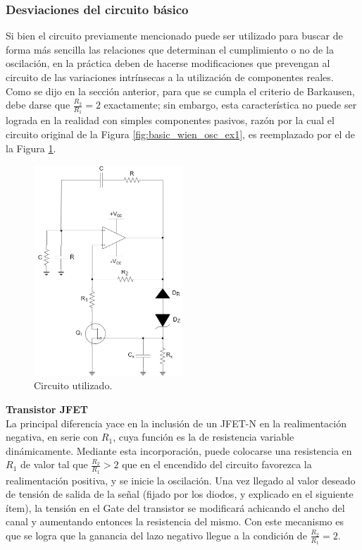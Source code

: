 \subsubsection{Desviaciones del circuito básico}
Si bien el circuito previamente mencionado puede ser utilizado para buscar de forma más sencilla las relaciones que determinan el cumplimiento o no de la oscilación, en 
la práctica deben de hacerse modificaciones que prevengan al circuito de las variaciones intrínsecas a la utilización de componentes reales.
Como se dijo en la sección anterior, para que se cumpla el criterio de Barkausen, debe darse que $\frac{R_2}{R_1} = 2$ exactamente; sin embargo, esta característica no 
puede ser lograda en la realidad con simples componentes pasivos, razón por la cual el circuito original de la Figura \ref{fig:basic_wien_osc_ex1}, es reemplazado por el 
de la Figura \ref{fig:wein_osc_circuit_ex1}.
\begin{figure}[H]
    \centering
    \includegraphics[width=0.5\textwidth]{../EJ1/Recursos/wein_osc_circuit.jpg}
    \caption{Circuito utilizado.}
    \label{fig:wein_osc_circuit_ex1}
\end{figure}

\textbf{Transistor JFET}\\
La principal diferencia yace en la inclusión de un JFET-N en la realimentación negativa, en serie con $R_1$, cuya función es la de resistencia variable 
dinámicamente.
Mediante esta incorporación, puede colocarse una resistencia en $R_1$ de valor tal que $\frac{R_2}{R_1} > 2$ que en el encendido del circuito favorezca 
la realimentación positiva, y se inicie la oscilación.
Una vez llegado al valor deseado de tensión de salida de la señal (fijado por los diodos, y explicado en el siguiente ítem), la tensión en el Gate del 
transistor se modificará achicando el ancho del canal y aumentando entonces la resistencia del mismo.
Con este mecanismo es que se logra que la ganancia del lazo negativo llegue a la condición de $\frac{R_2}{R_1} = 2$.

